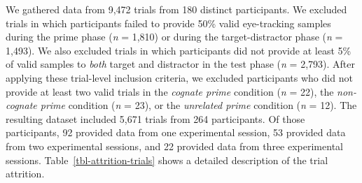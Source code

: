 \documentclass[
  letterpaper,
  DIV=11,
  numbers=noendperiod]{scrartcl}
\begin{document}
We gathered data from 9,472 trials from 180 distinct participants. We
excluded trials in which participants failed to provide 50\% valid
eye-tracking samples during the prime phase (\emph{n} = 1,810) or during
the target-distractor phase (\emph{n} = 1,493). We also excluded trials
in which participants did not provide at least 5\% of valid samples to
\emph{both} target and distractor in the test phase (\emph{n} = 2,793).
After applying these trial-level inclusion criteria, we excluded
participants who did not provide at least two valid trials in the
\emph{cognate prime} condition (\emph{n} = 22), the \emph{non-cognate
prime} condition (\emph{n} = 23), or the \emph{unrelated prime}
condition (\emph{n} = 12). The resulting dataset included 5,671 trials
from 264 participants. Of those participants, 92 provided data from one
experimental session, 53 provided data from two experimental sessions,
and 22 provided data from three experimental sessions.
Table~\ref{tbl-attrition-trials} shows a detailed description of the
trial attrition.
\end{document}
